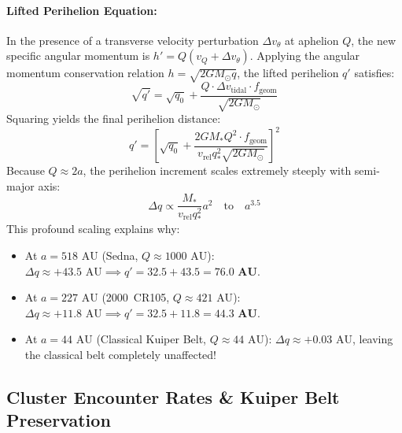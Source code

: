 \documentclass[11pt,a4paper]{article}
\begin{document}
\paragraph{Lifted Perihelion Equation:} In the presence of a transverse velocity perturbation $\Delta v_\theta$ at aphelion $Q$, the new specific angular momentum is $h' = Q (v_Q + \Delta v_\theta)$. Applying the angular momentum conservation relation $h = \sqrt{2GM_\odot q}$, the lifted perihelion $q'$ satisfies:
\begin{equation}
\sqrt{q'} = \sqrt{q_0} + \frac{Q \cdot \Delta v_{\text{tidal}} \cdot f_{\text{geom}}}{\sqrt{2 G M_\odot}}
\end{equation}
Squaring yields the final perihelion distance:
\begin{equation}
q' = \left[ \sqrt{q_0} + \frac{2 G M_* Q^2 \cdot f_{\text{geom}}}{v_{\text{rel}} q_*^2 \sqrt{2 G M_\odot}} \right]^2
\end{equation}
Because $Q \approx 2a$, the perihelion increment scales extremely steeply with semi-major axis:
\begin{equation}
\Delta q \propto \frac{M_*}{v_{\text{rel}} q_*^2} a^2 \quad \text{to} \quad a^{3.5}
\end{equation}
This profound scaling explains why:
\begin{itemize}
    \item At $a = 518\text{ AU}$ (Sedna, $Q \approx 1000\text{ AU}$): $\Delta q \approx +43.5\text{ AU} \implies q' = 32.5 + 43.5 = \mathbf{76.0\text{ AU}}$.
    \item At $a = 227\text{ AU}$ (2000~CR105, $Q \approx 421\text{ AU}$): $\Delta q \approx +11.8\text{ AU} \implies q' = 32.5 + 11.8 = \mathbf{44.3\text{ AU}}$.
    \item At $a = 44\text{ AU}$ (Classical Kuiper Belt, $Q \approx 44\text{ AU}$): $\Delta q \approx +0.03\text{ AU}$, leaving the classical belt completely unaffected!
\end{itemize}

\subsection{Cluster Encounter Rates \& Kuiper Belt Preservation}
\end{document}
